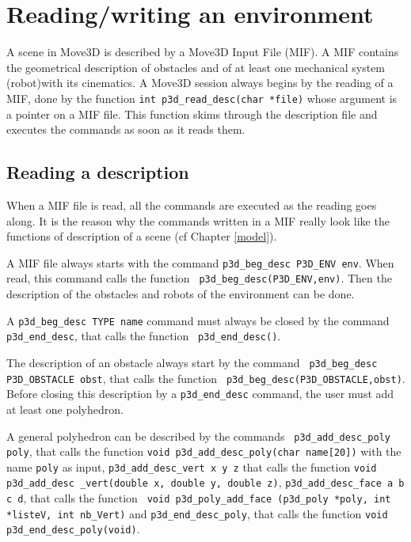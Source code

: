 \chapter{Reading/writing an environment}

A scene in Move3D is described by a Move3D Input File (MIF). A MIF
contains the geometrical description of obstacles and of at least one
mechanical system (robot)with its cinematics. A Move3D session always
begins by the reading of a MIF, done by the function {\tt int
p3d\_read\_desc(char *file)}  whose argument is a pointer on a MIF
file. This function skims through the description file and executes
the commands as soon as it reads them. 

\section{Reading a description}

When a MIF file is read, all the commands are executed as the reading
goes along. It is the reason why the commands written in a MIF really
look like the functions of description of a scene (cf Chapter
\ref{model}).

A MIF file always starts with the command  {\tt p3d\_beg\_desc P3D\_ENV
env}. When read, this command calls the function {\tt
p3d\_beg\_desc(P3D\_ENV,env)}. Then the description of the obstacles
and robots of the environment can be done.

A {\tt p3d\_beg\_desc TYPE name} command must always be closed by the
command  {\tt p3d\_end\_desc}, that calls the function {\tt
p3d\_end\_desc()}.

The description of an obstacle always start by the command {\tt
p3d\_beg\_desc P3D\_OBSTACLE obst}, that calls the function {\tt
p3d\_beg\_desc(P3D\_OBSTACLE,obst)}. Before closing this description
by a  {\tt p3d\_end\_desc} command, the user must add at least one
polyhedron. 

A general polyhedron can be described by the commands {\tt
p3d\_add\_desc\_poly poly}, that calls the function {\tt void
p3d\_add\_desc\_poly(char name[20])} with the name {\tt poly} as
input, {\tt p3d\_add\_desc\_vert x y z} that calls the
function {\tt void p3d\_add\_desc \_vert(double x, double y, double
z)}, {\tt p3d\_add\_desc\_face a b c d}, that calls the function {\tt
void p3d\_poly\_add\_face (p3d\_poly *poly, int *listeV, int
nb\_Vert)} and {\tt p3d\_end\_desc\_poly},
that calls the function {\tt void p3d\_end\_desc\_poly(void)}.


